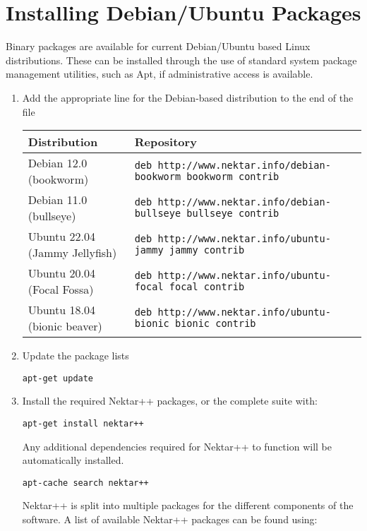 \section{Installing Debian/Ubuntu Packages}
\label{s:installation:debian}
Binary packages are available for current Debian/Ubuntu based Linux
distributions. These can be installed through the use of standard system package
management utilities, such as Apt, if administrative access is
available.

\begin{enumerate}
	\item Add the appropriate line for the Debian-based distribution to the end of
	the file 
	
	{\small
	\begin{tabular}{ll}
	\toprule
	Distribution & Repository \\
	\midrule
        Debian 12.0 (bookworm) &
        \texttt{deb http://www.nektar.info/debian-bookworm bookworm contrib} \\
        Debian 11.0 (bullseye) &
        \texttt{deb http://www.nektar.info/debian-bullseye bullseye contrib} \\
	Ubuntu 22.04 (Jammy Jellyfish) & 
	\texttt{deb http://www.nektar.info/ubuntu-jammy jammy contrib}\\
	Ubuntu 20.04 (Focal Fossa) & 
	\texttt{deb http://www.nektar.info/ubuntu-focal focal contrib}\\
	Ubuntu 18.04 (bionic beaver) & 
        \texttt{deb http://www.nektar.info/ubuntu-bionic bionic contrib}\\
	\bottomrule
	\end{tabular}
	}
	\item Update the package lists
	\begin{lstlisting}[style=BashInputStyle]
	apt-get update
	\end{lstlisting}
	\item Install the required Nektar++ packages, or the complete suite with:
	\begin{lstlisting}[style=BashInputStyle]
	apt-get install nektar++
	\end{lstlisting}
	Any additional dependencies required for Nektar++ to function will be
	automatically installed.
	
    \newsavebox\installationDebTip
    \begin{lrbox}{\installationDebTip}\begin{minipage}{0.8\linewidth}
    \begin{lstlisting}[style=BashInputStyle]
    apt-cache search nektar++
    \end{lstlisting}
    \end{minipage}
    \end{lrbox}
	
	\begin{tipbox}
	Nektar++ is split into multiple packages for the different components of the
	software. A list of available Nektar++ packages can be found using:
	\noindent\usebox\installationDebTip
	\end{tipbox}
\end{enumerate}


